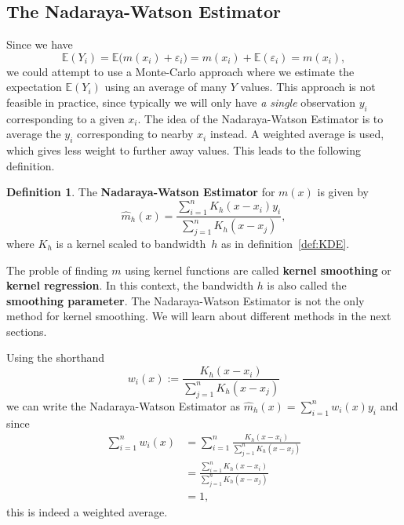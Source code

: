 \documentclass[
  a4paper,
]{article}
\theoremstyle{definition}
\newtheorem{definition}{Definition}[section]
\theoremstyle{definition}
\theoremstyle{definition}
\theoremstyle{definition}
\theoremstyle{remark}
\begin{document}
\hypertarget{the-nadaraya-watson-estimator}{%
\subsection{The Nadaraya-Watson Estimator}\label{the-nadaraya-watson-estimator}}

Since we have
\begin{equation*}
  \mathbb{E}(Y_i)
  = \mathbb{E}\bigl( m(x_i) + \varepsilon_i \bigr)
  = m(x_i) + \mathbb{E}( \varepsilon_i )
  = m(x_i),
\end{equation*}
we could attempt to use a Monte-Carlo approach where we estimate the
expectation \(\mathbb{E}(Y_i)\) using an average of many \(Y\) values. This approach is
not feasible in practice, since typically we will only have \emph{a single}
observation \(y_i\) corresponding to a given \(x_i\). The idea of the
Nadaraya-Watson Estimator is to average the \(y_i\) corresponding to nearby \(x_i\)
instead. A weighted average is used, which gives less weight to further away
values. This leads to the following definition.

\begin{definition}
\protect\hypertarget{def:NW}{}\label{def:NW}The \textbf{Nadaraya-Watson Estimator} for \(m(x)\) is given by
\begin{equation*}
  \hat m_h(x)
  = \frac{\sum_{i=1}^n K_h(x - x_i) y_i}{\sum_{j=1}^n K_h(x - x_j)},
\end{equation*}
where \(K_h\) is a kernel scaled to bandwidth~\(h\) as in
definition~\ref{def:KDE}.
\end{definition}

The proble of finding \(m\) using kernel functions are called \textbf{kernel smoothing}
or \textbf{kernel regression}. In this context, the bandwidth \(h\) is also called
the \textbf{smoothing parameter}. The Nadaraya-Watson Estimator is not the only
method for kernel smoothing. We will learn about different methods in the
next sections.

Using the shorthand
\begin{equation*}
  w_i(x)
  := \frac{K_h(x - x_i)}{\sum_{j=1}^n K_h(x - x_j)}
\end{equation*}
we can write the Nadaraya-Watson Estimator as
\(\hat m_h(x) = \sum_{i=1}^n w_i(x) y_i\) and since
\begin{align*}
  \sum_{i=1}^n w_i(x)
  &= \sum_{i=1}^n \frac{K_h(x - x_i)}{\sum_{j=1}^n K_h(x - x_j)} \\
  &= \frac{\sum_{i=1}^n K_h(x - x_i)}{\sum_{j=1}^n K_h(x - x_j)} \\
  &= 1,
\end{align*}
this is indeed a weighted average.
\end{document}
